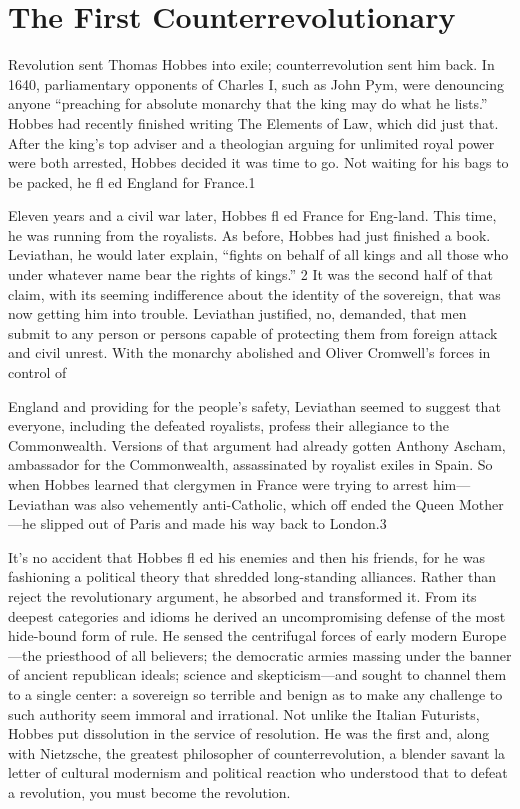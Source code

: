 \chapter{The First Counterrevolutionary}\label{The First Counterrevolutionary}
 \par 
Revolution sent Thomas Hobbes into exile; counterrevolution sent him back. In 1640, parliamentary opponents of Charles I, such as John Pym, were denouncing anyone “preaching for absolute monarchy that the king may do what he lists.” Hobbes had recently finished writing The Elements of Law, which did just that. After the king’s top adviser and a theologian arguing for unlimited royal power were both arrested, Hobbes decided it was time to go. Not waiting for his bags to be packed, he fl ed England for France.{\color{blue}1}
 \par 
Eleven years and a civil war later, Hobbes fl ed France for Eng-land. This time, he was running from the royalists. As before, Hobbes had just finished a book. Leviathan, he would later explain, “fights on behalf of all kings and all those who under whatever name bear the rights of kings.” {\color{blue}2} It was the second half of that claim, with its seeming indifference about the identity of the sovereign, that was now getting him into trouble. Leviathan justified, no, demanded, that men submit to any person or persons capable of protecting them from foreign attack and civil unrest. With the monarchy abolished and Oliver Cromwell’s forces in control of
 \par 
England and providing for the people’s safety, Leviathan seemed to suggest that everyone, including the defeated royalists, profess their allegiance to the Commonwealth. Versions of that argument had already gotten Anthony Ascham, ambassador for the Commonwealth, assassinated by royalist exiles in Spain. So when Hobbes learned that clergymen in France were trying to arrest him— Leviathan was also vehemently anti-Catholic, which off ended the Queen Mother—he slipped out of Paris and made his way back to London.{\color{blue}3}
 \par 
It’s no accident that Hobbes fl ed his enemies and then his friends, for he was fashioning a political theory that shredded long-standing alliances. Rather than reject the revolutionary argument, he absorbed and transformed it. From its deepest categories and idioms he derived an uncompromising defense of the most hide-bound form of rule. He sensed the centrifugal forces of early modern Europe—the priesthood of all believers; the democratic armies massing under the banner of ancient republican ideals; science and skepticism—and sought to channel them to a single center: a sovereign so terrible and benign as to make any challenge to such authority seem immoral and irrational. Not unlike the Italian Futurists, Hobbes put dissolution in the service of resolution. He was the first and, along with Nietzsche, the greatest philosopher of counterrevolution, a blender savant la letter of cultural modernism and political reaction who understood that to defeat a revolution, you must become the revolution.
